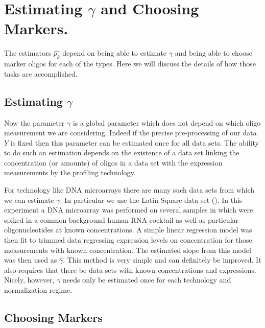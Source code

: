 \documentclass[reqno,12pt,oneside]{report}\usepackage[]{graphicx}\usepackage[]{color}
\theoremstyle{plain}
\theoremstyle{definition}
\theoremstyle{remark}
\numberwithin{theorem}{chapter}     %
\begin{document}
\section{Estimating $\gamma$ and Choosing Markers.}

The estimators $\widehat{p_k}$ depend on being able to estimate $\gamma$ and being able to choose marker oligos for each of the types. Here we will discuss the details of how those tasks are accomplished. 
  
\subsection{Estimating $\gamma$}
  
Now the parameter $\gamma$ is a global parameter which does not depend on which oligo measurement we are considering. Indeed if the precise pre-processing of our data $Y$ is fixed then this parameter can be estimated once for all data sets. The ability to do such an estimation depends on the existence of a data set linking the concentration (or amounts) of oligos in a data set with the expression measurements by the profiling technology. 

For technology like DNA microarrays there are many such data sets from which we can estimate $\gamma$. In particular we use the Latin Square data set (\cite{latin}). In this experiment a DNA microarray was performed on several samples in which were spiked in a common background human RNA cocktail as well as particular oligonucleotides at known concentrations. A simple linear regression model was then fit to trimmed data regressing expression levels on concentration for those measurements with known concentration. The estimated slope from this model was then used as $\widehat{\gamma}$. This method is very simple and can definitely be improved. It also requires that there be data sets with known concentrations and expressions. Nicely, however, $\gamma$ needs only be estimated once for each technology and normalization regime. 

\subsection{Choosing Markers}
\end{document}

